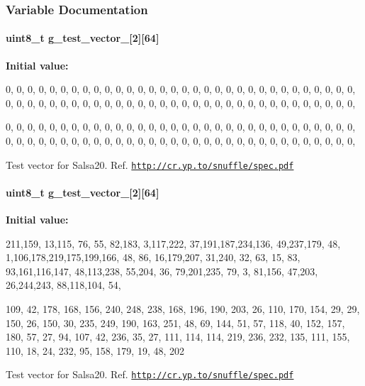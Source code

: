 \subsubsection{\-Variable \-Documentation}
\hypertarget{salsa-tests_8cc_adb3958be40d903bbd5c61996e8a68619}{
\paragraph[{g\-\_\-test\-\_\-vector\-\_\-0}]{\setlength{\rightskip}{0pt plus 5cm}uint8\-\_\-t {\bf g\-\_\-test\-\_\-vector\-\_}\mbox{[}2\mbox{]}\mbox{[}64\mbox{]}}}\label{salsa-tests_8cc_adb3958be40d903bbd5c61996e8a68619}
{\bfseries \-Initial value\-:}
\begin{DoxyCode}
 {
  
  {0, 0, 0, 0, 0, 0, 0, 0, 0, 0, 0, 0, 0, 0, 0, 0,
        0, 0, 0, 0, 0, 0, 0, 0, 0, 0, 0, 0, 0, 0, 0, 0,
        0, 0, 0, 0, 0, 0, 0, 0, 0, 0, 0, 0, 0, 0, 0, 0,
        0, 0, 0, 0, 0, 0, 0, 0, 0, 0, 0, 0, 0, 0, 0, 0},
  
  {0, 0, 0, 0, 0, 0, 0, 0, 0, 0, 0, 0, 0, 0, 0, 0,
        0, 0, 0, 0, 0, 0, 0, 0, 0, 0, 0, 0, 0, 0, 0, 0,
        0, 0, 0, 0, 0, 0, 0, 0, 0, 0, 0, 0, 0, 0, 0, 0,
        0, 0, 0, 0, 0, 0, 0, 0, 0, 0, 0, 0, 0, 0, 0, 0},
}
\end{DoxyCode}
\-Test vector for \-Salsa20. \-Ref. \href{http://cr.yp.to/snuffle/spec.pdf}{\tt http\-://cr.\-yp.\-to/snuffle/spec.\-pdf} \hypertarget{salsa-tests_8cc_ae57bf96a7e6063fa5ebe4619026a84e6}{
\paragraph[{g\-\_\-test\-\_\-vector\-\_\-1}]{\setlength{\rightskip}{0pt plus 5cm}uint8\-\_\-t {\bf g\-\_\-test\-\_\-vector\-\_}\mbox{[}2\mbox{]}\mbox{[}64\mbox{]}}}\label{salsa-tests_8cc_ae57bf96a7e6063fa5ebe4619026a84e6}
{\bfseries \-Initial value\-:}
\begin{DoxyCode}
 {
  
  {211,159, 13,115, 76, 55, 82,183, 3,117,222, 37,191,187,234,136,
        49,237,179, 48, 1,106,178,219,175,199,166, 48, 86, 16,179,207,
        31,240, 32, 63, 15, 83, 93,161,116,147, 48,113,238, 55,204, 36,
        79,201,235, 79, 3, 81,156, 47,203, 26,244,243, 88,118,104, 54},
  
  {109,  42, 178, 168, 156, 240, 248, 238, 168, 196, 190, 203,  26, 110, 170, 
      154,
        29,  29, 150,  26, 150,  30, 235, 249, 190, 163, 251,  48,  69, 144,  
      51,  57,
        118,  40, 152, 157, 180,  57,  27,  94, 107,  42, 236,  35,  27, 111, 
      114, 114,
        219, 236, 232, 135, 111, 155, 110,  18,  24, 232,  95, 158, 179,  19,  
      48, 202}
}
\end{DoxyCode}
\-Test vector for \-Salsa20. \-Ref. \href{http://cr.yp.to/snuffle/spec.pdf}{\tt http\-://cr.\-yp.\-to/snuffle/spec.\-pdf} 